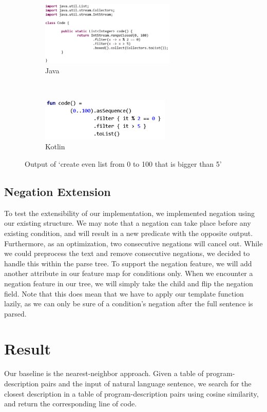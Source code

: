 \documentclass[11pt,letterpaper]{article}
\begin{document}
\begin{figure}[t!]
    \centering
    \begin{subfigure}[t]{0.5\textwidth}
        \centering
        \includegraphics[height=1.2in]{java}
        \caption{Java}
    \end{subfigure}%
    ~ 
    \begin{subfigure}[t]{0.5\textwidth}
        \centering
        \includegraphics[height=0.8in]{kotlin}
        \caption{Kotlin}
    \end{subfigure}
    
    \caption{Output of \lq create even list from 0 to 100 that is bigger than 5'}
\end{figure}

\subsection{Negation Extension}

To test the extensibility of our implementation, we implemented negation using our existing structure.
We may note that a negation can take place before any existing condition, and will result in a new predicate with the opposite output.
Furthermore, as an optimization, two consecutive negations will cancel out. 
While we could preprocess the text and remove consecutive negations, we decided to handle this within the parse tree.
To support the negation feature, we will add another attribute in our feature map for conditions only.
When we encounter a negation feature in our tree, we will simply take the child and flip the negation field.
Note that this does mean that we have to apply our template function lazily, as we can only be sure of a condition's negation after the full sentence is parsed.

\section{Result}
Our baseline is the nearest-neighbor approach. Given a table of program-description pairs and the input of natural language sentence, we search for the closest description in a table of program-description pairs using cosine similarity, and return the corresponding line of code.\\
\end{document}
